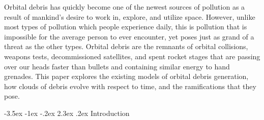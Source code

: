 \documentclass{article}
\makeatletter
\renewcommand\section{\clearpage\newpage\@startsection {section}{1}{\z@}%
	{-3.5ex \@plus -1ex \@minus -.2ex}%
	{2.3ex \@plus.2ex}%
	{\normalfont\Large\bfseries}}
\makeatother
\begin{document}
\myskip
\doublespace
Orbital debris has quickly become one of the newest sources of pollution as a result of mankind's desire to work in, explore, and utilize space. However, unlike most types of pollution which people experience daily, this is pollution that is impossible for the average person to ever encounter, yet poses just as grand of a threat as the other types. Orbital debris are the remnants of orbital collisions, weapons tests, decommissioned satellites, and spent rocket stages that are passing over our heads faster than bullets and containing similar energy to hand grenades. This paper explores the existing models of orbital debris generation, how clouds of debris evolve with respect to time, and the ramifications that they pose.
\singlespace
\newpage


\tableofcontents

\listoffigures



\setlength{\parindent}{1em}



\section{Introduction}
\label{introduction}
\doublespace
\end{document}
